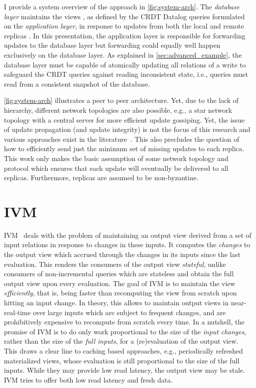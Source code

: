 I provide a system overview of the approach in \autoref{fig:system-arch}.
The \emph{database layer} maintains the views \deltaO{},
as defined by the \ac{CRDT} Datalog queries formulated on the \emph{application layer},
in response to updates from both the local  and remote replicas
.
In this presentation, the application layer is responsible for forwarding updates
to the database layer but forwarding could equally well happen exclusively
on the database layer.
As explained in \ref{sec:advanced_example}, the database layer must be capable
of atomically updating all relations of a write to safeguard the \ac{CRDT} queries
against reading inconsistent state,
i.e., queries must read from a consistent snapshot of the database.

\autoref{fig:system-arch} illustrates a peer to peer architecture.
Yet, due to the lack of hierarchy, different network topologies are also possible,
e.g., a star network topology with a central server for more efficient update gossiping.
Yet, the issue of update propagation (and update integrity) is not the focus
of this research and various approaches exist in the literature~\cite{
	auvolat2019merkle, sanjuan2020merkle, kleppmann2024bluesky,
	kleppmann2022making}.
This also precludes the question of how to efficiently send just the minimum
set of missing updates to each replica.
This work only makes the basic assumption of some network topology and protocol
which ensures that each update will eventually be delivered to all replicas.
Furthermore, replicas are assumed to be non-byzantine.

\section{\Acl{IVM}}\label{sec:ivm}

\Acl{IVM}~\cite{gupta1995maintenance} deals with the problem of maintaining
an output view derived from a set of input relations in response to changes
in these inputs.
It computes the \emph{changes} to the output view which accrued through
the changes in its inputs since the last evaluation.
This renders the consumers of the output view \emph{stateful},
unlike consumers of non-incremental queries which are stateless
and obtain the full output view upon every evaluation.
The goal of \ac{IVM} is to maintain the view \emph{efficiently}, that is,
being faster than recomputing the view from scratch upon hitting an input change.
In theory, this allows to maintain output views in near-real-time over large
inputs which are subject to frequent changes, and are prohibitively expensive to
recompute from scratch every time.
In a nutshell, the promise of \ac{IVM} is to do only work proportional to the
size of the \emph{input changes}, rather than the size of the \emph{full inputs},
for a (re)evaluation of the output view.
This draws a clear line to caching based approaches, e.g., periodically
refreshed materialized views, whose evaluation is still proportional
to the size of the full inputs.
While they may provide low read latency, the output view may be stale.
\ac{IVM} tries to offer both low read latency and fresh data.

